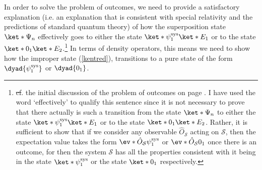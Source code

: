 \documentclass[12pt]{report}
\providecommand{\DIFadd}[1]{{\protect\color{blue}\uwave{#1}}} %
\providecommand{\DIFdel}[1]{{\protect\color{red}\sout{#1}}}                      %
\providecommand{\DIFaddbegin}{} %
\providecommand{\DIFaddend}{} %
\providecommand{\DIFdelbegin}{} %
\providecommand{\DIFdelend}{} %
\begin{document}
In order to solve the problem of outcomes, we need to provide a satisfactory explanation (i.e. an explanation that is consistent with special relativity and the predictions of standard quantum theory)  of how the superposition state $\ket*{\Psi_n}$ effectively goes to either the state $\ket*{\psi_1^\text{sys}}\ket*{E_1}$ or to the state $\ket*{0_1}\ket*{E_2}$.\footnote{\DIFdelbegin \DIFdel{cf}\DIFdelend \DIFaddbegin \DIFadd{Cf}\DIFaddend . the initial discussion of the problem of outcomes on page \pageref{proboutcomes}. I have used the word `effectively' to qualify this sentence since it is not necessary to prove that there actually is such a transition from the state  $\ket*{\Psi_n}$ to either the state $\ket*{\psi_1^\text{sys}}\ket*{E_1}$ or to the state $\ket*{0_1}\ket*{E_2}$. Rather, it is sufficient to show that if we consider any observable $\hat{O}_{\mathcal{S}}$ acting on $\mathcal{S}$, then the expectation value takes the form $\ev*{\hat{O}_{\mathcal{S}}}{\psi_1^\text{sys}}$ or $\ev*{\hat{O}_{\mathcal{S}}}{0_1}$ once there is an outcome, for then the system $\mathcal{S}$ has all the properties consistent with it being in the state $\ket*{\psi_1^\text{sys}}$ or the state $\ket*{0_1}$ respectively.} In terms of density operators, this means we need to show how the improper state (\ref{kentred}), transitions to a pure state of the form $\dyad{\psi_1^\text{sys}}$ or $\dyad{0_1}$.  
\end{document}
